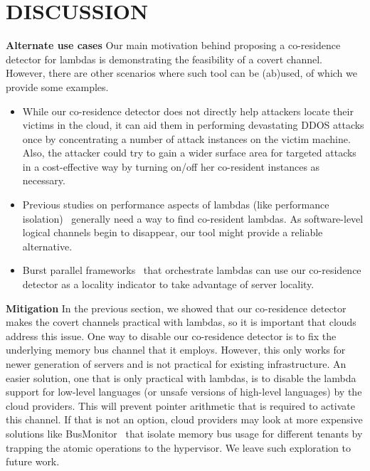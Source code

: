 \section{DISCUSSION}
\label{sec:discussion}
\textbf{Alternate use cases}
Our main motivation behind proposing a co-residence detector for lambdas is
demonstrating the feasibility of a covert channel. However, there are other
scenarios where such tool can be (ab)used, of which we provide some examples. 
\begin{itemize}
    \item While our co-residence detector does not directly help attackers
    locate their victims in the cloud, it can aid them in performing devastating 
    DDOS attacks once by concentrating a number of attack instances on the victim 
    machine. Also, the attacker could try to gain a wider surface area for 
    targeted attacks in a cost-effective way by turning on/off her co-resident 
    instances as necessary. 
    \item Previous studies on performance aspects of lambdas (like performance 
    isolation)~\cite{wangusenix2018} generally need a way to find co-resident
    lambdas. As software-level logical channels begin to disappear, our tool 
    might provide a reliable alternative.
    \item Burst parallel frameworks~\cite{234886} that orchestrate lambdas can
    use our co-residence detector as a locality indicator to take advantage of
    server locality.
\end{itemize}

\textbf{Mitigation}
In the previous section, we showed that our co-residence detector makes the covert
channels practical with lambdas, so it is important that clouds address this
issue. One way to disable our co-residence detector is to fix the underlying
memory bus channel that it employs. However, this only works for newer
generation of servers and is not practical for existing infrastructure. An
easier solution, one that is only practical with lambdas, is to disable the
lambda support for low-level languages (or unsafe versions of high-level
languages) by the cloud providers. This will prevent pointer arithmetic that is
required to activate this channel. If that is not an option, cloud providers may look at
more expensive solutions like BusMonitor~\cite{MemoryBusMitigation} that isolate
memory bus usage for different tenants by trapping the atomic operations to the 
hypervisor. We leave such exploration to future work.
